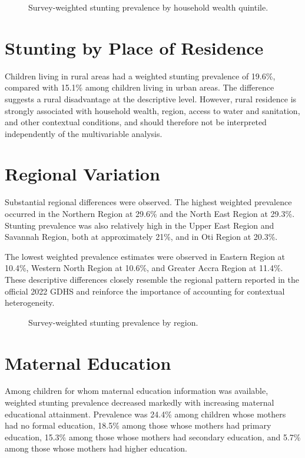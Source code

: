 \begin{figure}[H]
\centering

\caption{Survey-weighted stunting prevalence by household wealth quintile.}
\label{fig:stunting_wealth}
\end{figure}

\section{Stunting by Place of Residence}

Children living in rural areas had a weighted stunting prevalence of 19.6\%, compared with 15.1\% among children living in urban areas. The difference suggests a rural disadvantage at the descriptive level. However, rural residence is strongly associated with household wealth, region, access to water and sanitation, and other contextual conditions, and should therefore not be interpreted independently of the multivariable analysis.

\section{Regional Variation}

Substantial regional differences were observed. The highest weighted prevalence occurred in the Northern Region at 29.6\% and the North East Region at 29.3\%. Stunting prevalence was also relatively high in the Upper East Region and Savannah Region, both at approximately 21\%, and in Oti Region at 20.3\%.

The lowest weighted prevalence estimates were observed in Eastern Region at 10.4\%, Western North Region at 10.6\%, and Greater Accra Region at 11.4\%. These descriptive differences closely resemble the regional pattern reported in the official 2022 GDHS and reinforce the importance of accounting for contextual heterogeneity.


\begin{figure}[H]
\centering

\caption{Survey-weighted stunting prevalence by region.}
\label{fig:stunting_region}
\end{figure}

\section{Maternal Education}

Among children for whom maternal education information was available, weighted stunting prevalence decreased markedly with increasing maternal educational attainment. Prevalence was 24.4\% among children whose mothers had no formal education, 18.5\% among those whose mothers had primary education, 15.3\% among those whose mothers had secondary education, and 5.7\% among those whose mothers had higher education.

